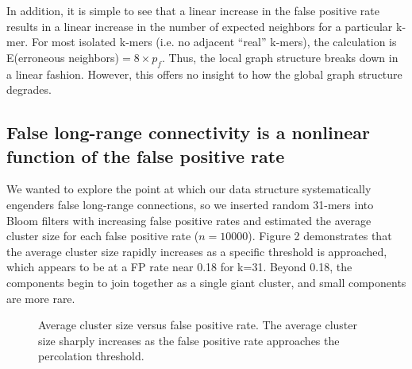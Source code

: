 \documentclass[12pt]{article} \usepackage{simplemargins}
\begin{document}
In addition, it is simple to see that a linear increase in the false 
positive rate results in a linear increase in the number of expected 
neighbors for a particular k-mer. For most isolated k-mers (i.e. no adjacent 
``real'' k-mers), the calculation is 
E(erroneous neighbors)$ = 8 \times p_f$. Thus, the local graph 
structure breaks down in a linear fashion. However, this offers no insight 
to how the global graph structure degrades.

\subsection{False long-range connectivity is a nonlinear function of the false positive rate}

We wanted to explore the point at which our data structure systematically 
engenders false long-range connections, 
so we inserted random 31-mers into Bloom
filters with increasing false positive rates and estimated the average
cluster size for each false positive rate ($n=10000$). Figure 2 demonstrates that 
the average cluster
size rapidly increases as a specific threshold is approached,
which appears to be at a FP rate near 0.18 for k=31. Beyond 0.18, 
the components begin to join together as a single giant 
cluster, and small components are more rare.

\begin{figure}
\caption{Average cluster size versus false positive rate. The average 
cluster size sharply increases as the false positive 
rate approaches the percolation threshold.
}
\end{figure}
\end{document}
